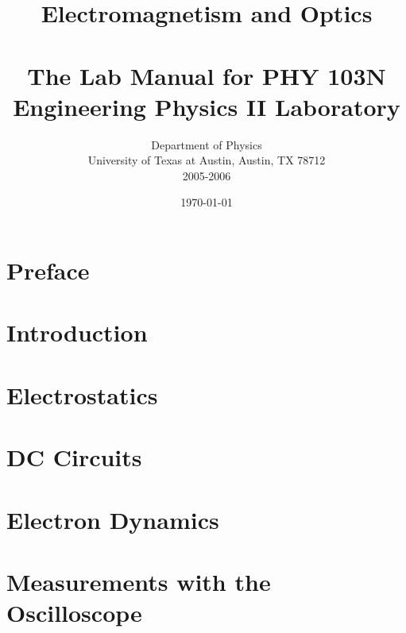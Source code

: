 \documentclass[12pt,letterpaper]{book}
\title{{\huge Electromagnetism and Optics} \\ 
\ \\
{\Large \bf The Lab Manual for PHY 103N \\
Engineering Physics II Laboratory }}
\author{ Department of Physics \\ 
 University of Texas at Austin, Austin, TX 78712\\
2005-2006}
\date{\today}
\begin{document}

\maketitle

\renewcommand{\thepage}{\roman{page}}

\tableofcontents

\renewcommand{\chaptername}{}
\renewcommand{\thechapter}{}

\chapter{Preface}  %


\renewcommand{\chaptername}{Chapter}

\renewcommand{\thepage}{\arabic{page}}
\setcounter{page}{0}

\renewcommand{\thechapter}{0}

\chapter{Introduction}
\label{ch:intro}


  \renewcommand{\thechapter}{\arabic{chapter}}
  \setcounter{chapter}{0}


\chapter{Electrostatics}


\chapter{DC Circuits}


\chapter{Electron Dynamics}


\chapter{Measurements with the Oscilloscope}

\end{document}
